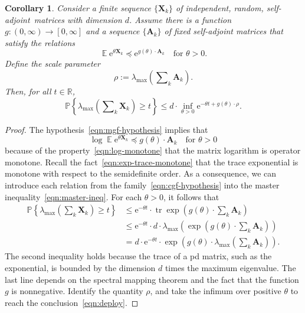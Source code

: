 \documentclass[11pt,letterpaper,twoside,reqno,draft]{amsart}
\newtheorem{cor}[thm]{Corollary}
\theoremstyle{remark}
\numberwithin{equation}{section}
\numberwithin{thm}{section}
\begin{document}
\begin{cor} \label{cor:main-result-indep}
Consider a finite sequence $\{ {\bm{{X}}}_k \}$ of independent, random, self-adjoint~matrices with dimension $d$.   Assume there is a function $g : (0, \infty) \to [0, \infty]$ and a sequence $\{{\bm{{A}}}_k\}$ of fixed self-adjoint matrices that satisfy the relations
\begin{equation} \label{eqn:mgf-hypothesis}
{\operatorname{\mathbb{E}}} {\mathrm{e}}^{\theta {\bm{{X}}}_k} {\preccurlyeq} {\mathrm{e}}^{g(\theta) \cdot {\bm{{A}}}_k}
\quad\text{for $\theta > 0$.}
\end{equation}
Define the scale parameter
$$
\rho := \lambda_{\max}\left( \sum\nolimits_k {\bm{{A}}}_k \right).
$$
Then, for all $t \in \mathbb{R}$,
\begin{equation} \label{eqn:deploy}
{\mathbb{P}\left\{ {{ \lambda_{\max}\left(\sum\nolimits_k {\bm{{X}}}_k \right) \geq t }} \right\}}
	\leq d \cdot \inf_{\theta > 0} {\mathrm{e}}^{- \theta t + g(\theta) \cdot \rho }.
\end{equation}
\end{cor}

\begin{proof}
The hypothesis~\eqref{eqn:mgf-hypothesis} implies that
\begin{equation} \label{eqn:cgf-hypothesis}
\log {\operatorname{\mathbb{E}}} {\mathrm{e}}^{\theta {\bm{{X}}}_k} {\preccurlyeq} g(\theta) \cdot {\bm{{A}}}_k
\quad\text{for $\theta > 0$}
\end{equation}
because of the property~\eqref{eqn:log-monotone} that the matrix logarithm is operator monotone.
Recall the fact~\eqref{eqn:exp-trace-monotone} that the trace exponential is monotone with respect to the semidefinite order.  As a consequence, we can introduce each relation from the family~\eqref{eqn:cgf-hypothesis} into the master inequality~\eqref{eqn:master-ineq}.  For each $\theta > 0$, it follows that
\begin{align*}
{\mathbb{P}\left\{ {{ \lambda_{\max}\left(\sum\nolimits_k {\bm{{X}}}_k \right) \geq t }} \right\}}
	&\leq {\mathrm{e}}^{-\theta t}
	\cdot {\operatorname{tr}} \exp\left( g(\theta) \cdot \sum\nolimits_k {\bm{{A}}}_k \right) \\
	&\leq {\mathrm{e}}^{-\theta t}
	\cdot d \cdot \lambda_{\max}\left( \exp \left( g(\theta) \cdot \sum\nolimits_k {\bm{{A}}}_k \right) \right) \\
	&= d \cdot {\mathrm{e}}^{-\theta t}
	\cdot \exp\left( g(\theta) \cdot \lambda_{\max}\left( \sum\nolimits_k {\bm{{A}}}_k
	\right)\right).	
\end{align*}
The second inequality holds because the trace of a pd matrix, such as the exponential, is bounded by the dimension $d$ times the maximum eigenvalue.  The last line depends on the spectral mapping theorem and the fact that the function $g$ is nonnegative.  Identify the quantity $\rho$, and take the infimum over positive $\theta$ to reach the conclusion~\eqref{eqn:deploy}.
\end{proof}
\end{document}
